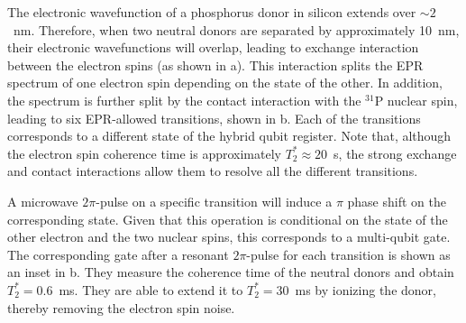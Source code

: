 
The electronic wavefunction of a phosphorus donor in silicon extends over $\sim2$~nm. Therefore, when two neutral donors are separated by approximately 10~nm, their electronic wavefunctions will overlap, leading to exchange interaction between the electron spins (as shown in a). This interaction splits the EPR spectrum of one electron spin depending on the state of the other. In addition, the spectrum is further split by the contact interaction with the $^{31}\mathrm{P}$ nuclear spin, leading to six EPR-allowed transitions, shown in b. Each of the transitions corresponds to a different state of the hybrid qubit register. Note that, although the electron spin coherence time is approximately $T_2^*\approx 20$~\textmu s, the strong exchange and contact interactions allow them to resolve all the different transitions. 

A microwave $2\pi$-pulse on a specific transition will induce a $\pi$ phase shift on the corresponding state. Given that this operation is conditional on the state of the other electron and the two nuclear spins, this corresponds to a multi-qubit gate. The corresponding gate after a resonant $2\pi$-pulse for each transition is shown as an inset in b. They measure the coherence time of the neutral donors and obtain $T_2^* =0.6$~ms. They are able to extend it to $T_2^* = 30$~ms by ionizing the donor, thereby removing the electron spin noise.


